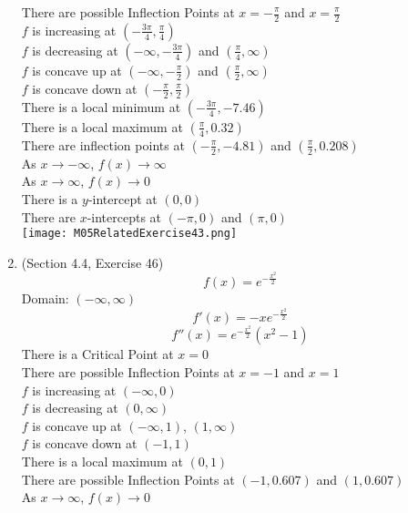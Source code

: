 \documentclass{article}
\begin{document}
\begin{enumerate}
        There are possible Inflection Points at $x = -\frac{\pi}{2}$ and $x = \frac{\pi}{2}$ \\
        $f$ is increasing at $\left(-\frac{3\pi}{4}, \frac{\pi}{4}\right)$ \\
        $f$ is decreasing at $\left(-\infty, -\frac{3\pi}{4}\right)$ and $\left(\frac{\pi}{4}, \infty\right)$ \\
        $f$ is concave up at $\left(-\infty, -\frac{\pi}{2}\right)$ and $\left(\frac{\pi}{2}, \infty\right)$ \\
        $f$ is concave down at $\left(-\frac{\pi}{2}, \frac{\pi}{2}\right)$ \\
        There is a local minimum at $\left(-\frac{3\pi}{4}, -7.46\right)$ \\
        There is a local maximum at $\left(\frac{\pi}{4}, 0.32\right)$ \\
        There are inflection points at $(-\frac{\pi}{2}, -4.81)$ and $(\frac{\pi}{2}, 0.208)$ \\
        As $x \to -\infty$, $f(x) \to \infty$ \\
        As $x \to \infty$, $f(x) \to 0$ \\
        There is a $y$-intercept at $(0, 0)$ \\
        There are $x$-intercepts at $(-\pi, 0)$ and $(\pi, 0)$ \\
        \texttt{[image: M05RelatedExercise43.png]}
    \item (Section 4.4, Exercise 46)
        $$f(x) = e^{-\frac{x^2}{2}}$$
        Domain: $(-\infty, \infty)$ \\
        $$f'(x) = -xe^{-\frac{x^2}{2}}$$
        $$f''(x) = e^{-\frac{x^2}{2}}\left(x^2 - 1\right)$$
        There is a Critical Point at $x = 0$ \\
        There are possible Inflection Points at $x = -1$ and $x = 1$ \\
        $f$ is increasing at $(-\infty, 0)$ \\
        $f$ is decreasing at $(0, \infty)$ \\
        $f$ is concave up at $(-\infty, 1)$, $(1, \infty)$ \\
        $f$ is concave down at $(-1, 1)$ \\
        There is a local maximum at $(0, 1)$ \\
        There are possible Inflection Points at $(-1, 0.607)$ and $(1, 0.607)$ \\
        As $x \to \infty$, $f(x) \to 0$ \\

\end{enumerate}
\end{document}
